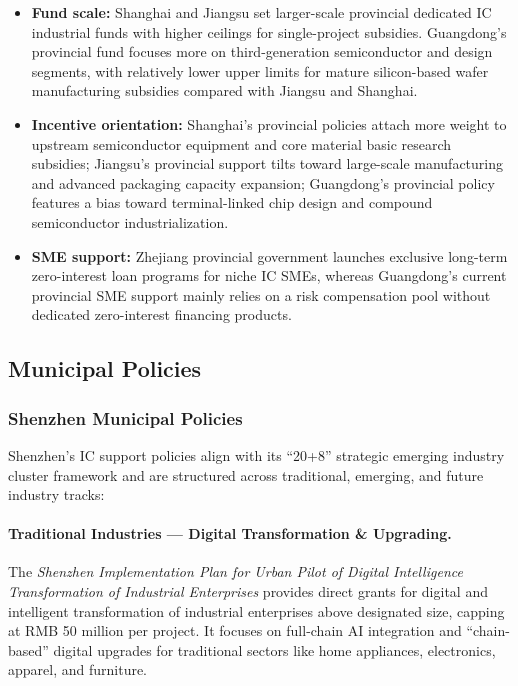 \documentclass[12pt,a4paper]{article}
\begin{document}
\begin{itemize}
    \item \textbf{Fund scale:} Shanghai and Jiangsu set larger-scale
          provincial dedicated IC industrial funds with higher ceilings
          for single-project subsidies. Guangdong's provincial fund
          focuses more on third-generation semiconductor and design
          segments, with relatively lower upper limits for mature
          silicon-based wafer manufacturing subsidies compared with
          Jiangsu and Shanghai.
    \item \textbf{Incentive orientation:} Shanghai's provincial policies
          attach more weight to upstream semiconductor equipment and core
          material basic research subsidies; Jiangsu's provincial support
          tilts toward large-scale manufacturing and advanced packaging
          capacity expansion; Guangdong's provincial policy features a
          bias toward terminal-linked chip design and compound
          semiconductor industrialization.
    \item \textbf{SME support:} Zhejiang provincial government launches
          exclusive long-term zero-interest loan programs for niche IC
          SMEs, whereas Guangdong's current provincial SME support mainly
          relies on a risk compensation pool without dedicated
          zero-interest financing products.
\end{itemize}

\subsection{Municipal Policies}
\label{sec:municipal_policy}

\subsubsection{Shenzhen Municipal Policies}

Shenzhen's IC support policies align with its ``20+8'' strategic emerging
industry cluster framework and are structured across traditional,
emerging, and future industry tracks:

\paragraph{Traditional Industries — Digital Transformation \& Upgrading.}
The \textit{Shenzhen Implementation Plan for Urban Pilot of Digital
Intelligence Transformation of Industrial Enterprises} provides direct
grants for digital and intelligent transformation of industrial
enterprises above designated size, capping at RMB 50 million per project.
It focuses on full-chain AI integration and ``chain-based'' digital
upgrades for traditional sectors like home appliances, electronics,
apparel, and furniture.
\end{document}
